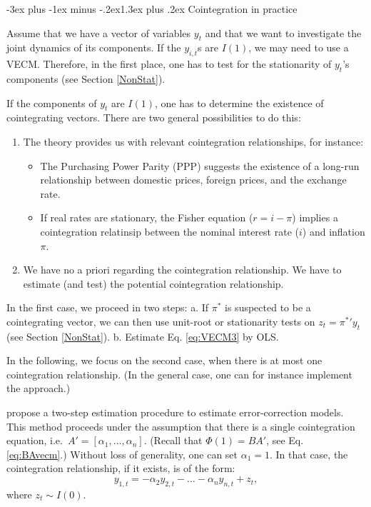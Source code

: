 \documentclass[
  11pt,
]{book}
\makeatletter
\providecommand{\tightlist}{%
  \setlength{\itemsep}{0pt}\setlength{\parskip}{0pt}}
\renewcommand\section{\@startsection{section}{1}{\z@}
  {-3ex plus -1ex minus -.2ex}{1.3ex plus .2ex}
  {\normalfont\Large\bfseries\color{TextbookInk}}}
\theoremstyle{definition}
\theoremstyle{definition}
\theoremstyle{definition}
\theoremstyle{definition}
\theoremstyle{remark}
\makeatother
\begin{document}
\section{Cointegration in practice}\label{cointegration-in-practice}

Assume that we have a vector of variables \(y_t\) and that we want to investigate the joint dynamics of its components. If the \(y_{i,t}\)s are \(I(1)\), we may need to use a VECM. Therefore, in the first place, one has to test for the stationarity of \(y_t\)'s components (see Section \ref{NonStat}).

If the components of \(y_t\) are \(I(1)\), one has to determine the existence of cointegrating vectors. There are two general possibilities to do this:

\begin{enumerate}
\def\labelenumi{\arabic{enumi}.}
\tightlist
\item
  The theory provides us with relevant cointegration relationships, for instance:

  \begin{itemize}
  \tightlist
  \item
    The Purchasing Power Parity (PPP) suggests the existence of a long-run relationship between domestic prices, foreign prices, and the exchange rate.
  \item
    If real rates are stationary, the Fisher equation (\(r=i-\pi\)) implies a cointegration relatinsip between the nominal interest rate (\(i\)) and inflation \(\pi\).
  \end{itemize}
\item
  We have no a priori regarding the cointegration relationship. We have to estimate (and test) the potential cointegration relationship.
\end{enumerate}

In the first case, we proceed in two steps:
a. If \(\pi^*\) is suspected to be a cointegrating vector, we can then use unit-root or stationarity tests on \(z_t={\pi^*}' y_t\) (see Section \ref{NonStat}).
b. Estimate Eq. \eqref{eq:VECM3} by OLS.

In the following, we focus on the second case, when there is at most one cointegration relationship. (In the general case, one can for instance implement the \citet{Johansen_1991} approach.)

\citet{Engle_Granger_1987} propose a two-step estimation procedure to estimate error-correction models. This method proceeds under the assumption that there is a single cointegration equation, i.e.~\(A' = [\alpha_1,\dots,\alpha_n]\). (Recall that \(\Phi(1) = BA'\), see Eq. \eqref{eq:BAvecm}.) Without loss of generality, one can set \(\alpha_1=1\). In that case, the cointegration relationship, if it exists, is of the form:
\[
y_{1,t} = - \alpha_2 y_{2,t} - \dots - \alpha_n y_{n,t} + z_t,
\]
where \(z_t \sim I(0)\).
\end{document}
